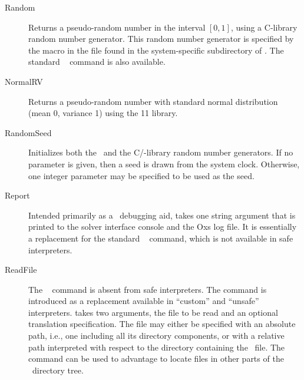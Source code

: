 \begin{description}
\item[Random]
Returns a pseudo-random number in the interval $[0,1]$, using a
C-library random number generator.  This random number generator is
specified by the  macro in the  file found in
the system-specific subdirectory of .  The standard
\Tcl\  command is also available.

\item[NormalRV]
Returns a pseudo-random number with standard normal distribution (mean
0, variance 1) using the {\Cplusplus}11 
library.

\item[RandomSeed]
Initializes both the \Tcl\ and the C/{\Cplusplus}-library random number
generators. If no parameter is given, then a seed is drawn from the
system clock. Otherwise, one integer parameter may be specified to be
used as the seed.

\item[Report]
Intended primarily as a \MIF\ debugging aid,  takes one
string argument that is printed to the solver interface console and the
Oxs log file.  It is essentially a replacement for the standard \Tcl\
 command, which is not available in safe interpreters.

\item[ReadFile]
The \Tcl\  command is absent from safe interpreters.  The
 command is introduced as a replacement available in
``custom'' and ``unsafe'' interpreters.  \cd{ReadFile} takes two
arguments, the file to be read and an optional translation
specification.  The file may either be specified with an absolute path,
i.e., one including all its directory components, or with a relative
path interpreted with respect to the directory containing the \MIF\
file.  The  command can be used to advantage to locate
files in other parts of the \OOMMF\ directory tree.


\end{description}
